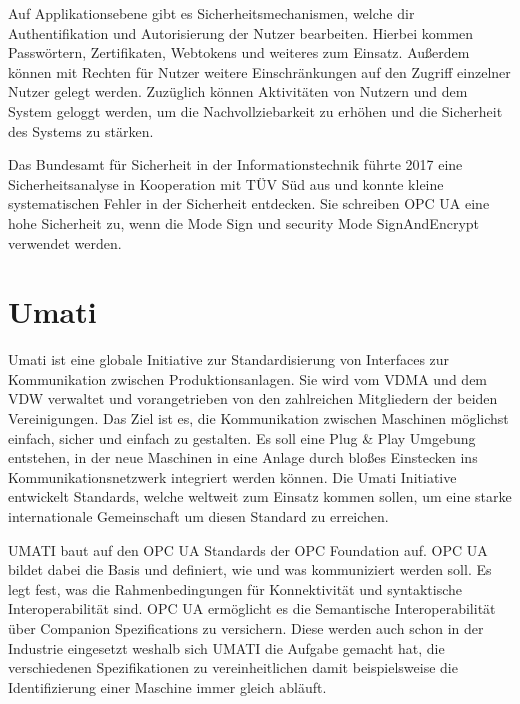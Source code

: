 \documentclass[a4paper, 12pt, oneside]{scrbook}
\begin{document}
		Auf Applikationsebene gibt es Sicherheitsmechanismen, welche dir Authentifikation und Autorisierung der Nutzer bearbeiten. Hierbei kommen Passwörtern, Zertifikaten, Webtokens und weiteres zum Einsatz. Außerdem können mit Rechten für Nutzer weitere Einschränkungen auf den Zugriff einzelner Nutzer gelegt werden. Zuzüglich können Aktivitäten von Nutzern und dem System geloggt werden, um die Nachvollziebarkeit zu erhöhen und die Sicherheit des Systems zu stärken. \cite{noauthor_unified_nodate, noauthor_opc_nodate}
		
		Das Bundesamt für Sicherheit in der Informationstechnik führte 2017 eine Sicherheitsanalyse in Kooperation mit TÜV Süd aus und konnte kleine systematischen Fehler in der Sicherheit entdecken. Sie schreiben OPC UA eine hohe Sicherheit zu, wenn die  Mode Sign und security Mode SignAndEncrypt verwendet werden. \cite{damm_opc_2017}
		
		
	
	\section{Umati}
		
		Umati ist eine globale Initiative zur Standardisierung von Interfaces zur Kommunikation zwischen Produktionsanlagen. Sie wird vom \ac{VDMA} und dem \ac{VDW} verwaltet und vorangetrieben von den zahlreichen Mitgliedern der beiden Vereinigungen. Das Ziel ist es, die Kommunikation zwischen Maschinen möglichst einfach, sicher und einfach zu gestalten. Es soll eine Plug \& Play Umgebung entstehen, in der neue Maschinen in eine Anlage durch bloßes Einstecken ins Kommunikationsnetzwerk integriert werden können. Die Umati Initiative entwickelt Standards, welche weltweit zum Einsatz kommen sollen, um eine starke internationale Gemeinschaft um diesen Standard zu erreichen. \cite{noauthor_umati_2023}
		
		\ac{UMATI} baut auf den OPC UA Standards der OPC Foundation auf. OPC UA bildet dabei die Basis und definiert, wie und was kommuniziert werden soll. Es legt fest, was die Rahmenbedingungen für Konnektivität und syntaktische Interoperabilität sind. \cite{noauthor_umati_2023} OPC UA ermöglicht es die Semantische Interoperabilität über Companion Spezifications zu versichern. Diese werden auch schon in der Industrie eingesetzt weshalb sich \ac{UMATI} die Aufgabe gemacht hat, die verschiedenen Spezifikationen zu vereinheitlichen damit beispielsweise die Identifizierung einer Maschine immer gleich abläuft.
		
\end{document}

